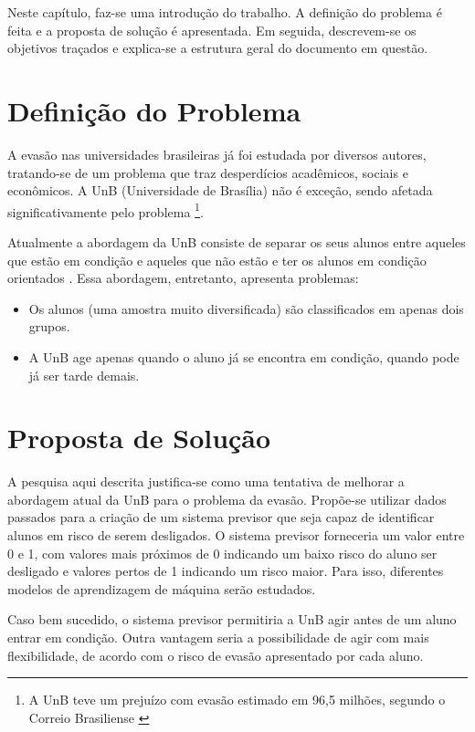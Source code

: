 Neste capítulo, faz-se uma introdução do trabalho. A definição do problema é feita e
a proposta de solução é apresentada. Em seguida, descrevem-se os objetivos traçados e
explica-se a estrutura geral do documento em questão. 

\section{Definição do Problema}
A evasão nas universidades brasileiras já foi estudada por diversos autores,
tratando-se de um problema que traz desperdícios acadêmicos, sociais e econômicos.
A UnB (Universidade de Brasília) não é exceção, sendo afetada significativamente pelo
problema \footnote{A UnB teve um prejuízo com evasão estimado em 96,5 milhões,
segundo o Correio Brasiliense \cite{correio}}.

\par Atualmente a abordagem da UnB consiste de separar os seus alunos entre aqueles
que estão em condição e aqueles que não estão e ter os alunos em condição orientados
\cite{manual_calouro}. Essa abordagem, entretanto, apresenta problemas:
\begin{itemize}
    \item Os alunos (uma amostra muito diversificada) são classificados em apenas
dois grupos.
    \item A UnB age apenas quando o aluno já se encontra em condição, quando pode
já ser tarde demais.
\end{itemize}

\section{Proposta de Solução}
A pesquisa aqui descrita justifica-se como uma tentativa de melhorar a abordagem
atual da UnB para o problema da evasão. Propõe-se utilizar dados passados para
a criação de um sistema previsor que seja capaz de identificar alunos em risco de
serem desligados. O sistema previsor forneceria um valor entre 0 e 1, com valores
mais próximos de 0 indicando um baixo risco do aluno ser desligado e valores pertos de
1 indicando um risco maior. Para isso, diferentes modelos de aprendizagem de máquina
serão estudados. 
\par Caso bem sucedido, o sistema previsor permitiria a
UnB agir antes de um aluno entrar em condição. Outra vantagem seria a possibilidade
de agir com mais flexibilidade, de acordo com o risco de evasão apresentado por cada
aluno. 


